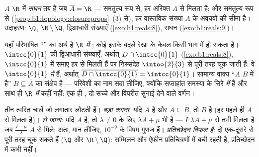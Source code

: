 \begin{definition}[सघनता, सांस्थितिक रूप]\label{def:b1:topology:dense}
$A$ $\R$ में \emph{सघन} तब है जब $\overline A = \R$ --- समतुल्य
रूप से, हर अरिक्त   $A$ से मिलता है; और समतुल्य रूप से
(\cref{prop:b1:topology:closureprops}~(3) से), हर वास्तविक संख्या $A$ के
अवयवों की सीमा है। उदाहरण: $\Q$, $\R \setminus \Q$, द्विआधारी संख्याएँ
(\cref{exo:b1:reals:8}), सघन  (\cref{exo:b1:reals:9})।
\end{definition}

\begin{example}[सघनता सापेक्ष है]\label{ex:b1:topology:relativedensity}
यहाँ परिभाषित ``'' का अर्थ है \emph{$\R$ में} ; कोई  इसके बदले
रेखा के केवल किसी भाग में  हो सकता है। $\intcc{0}{1}$ की द्विआधारी
संख्याएँ, अर्थात् $D \cap \intcc{0}{1}$ (\cref{exo:b1:reals:8}),
$\intcc{0}{1}$ में समाए हर   से मिलती हैं पर निस्संदेह
$\intoo{2}{3}$ से पूरी तरह चूक जाती हैं: वे $\intcc{0}{1}$ \emph{में} 
हैं, अर्थात् $\overline{D \cap \intcc{0}{1}} = \intcc{0}{1}$। सामान्य वाक्य
``$A$ $B$ में  है'' $B \subseteq \overline A$ का संक्षेप है --- परिवेशी
 का नाम सदा लीजिए, क्योंकि सप्ताहांत समस्या के सिरे \emph{ में}  हैं और साथ ही \emph{$\R$ में} कहीं  नहीं: एक ही ,
दो सच्चे और विपरीत सुनाई देने वाले वर्णन।
\end{example}

\begin{example}\label{ex:b1:topology:densitytricks}
तीन त्वरित चालें जो लगातार लौटती हैं। \emph{बड़ा करना}: यदि $A$  है और $A
\subseteq B$, तो $B$  है (हर  पहले ही $A$ से मिलता है)। \emph{ले
जाना}: यदि $A$  है, तो $\lambda \neq 0$ के लिए $\lambda A + \mu$ भी 
है ---  $I$ $\lambda A + \mu$ से तभी मिलता है जब  $\frac{I -
\mu}{\lambda}$ $A$ से मिले; अतः, मान लीजिए, $10^{-9}$ के विषम गुणज  हैं।
\emph{प्रतिच्छेदन विफल है}: दो   एक-दूसरे से पूरी तरह चूक सकते हैं
($\Q$ और $\R \setminus \Q$):  सम्मिलन और ऐफ़ीन प्रतिचित्रणों में बची
रहती है, प्रतिच्छेदन में कभी नहीं।
\end{example}

